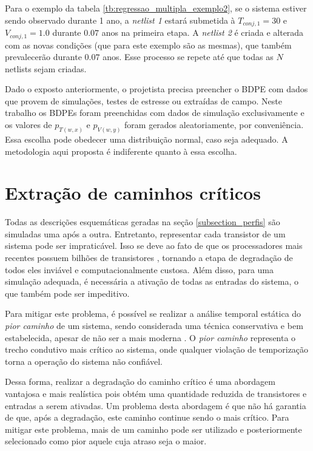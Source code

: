 Para o exemplo da tabela \ref{tb:regressao_multipla_exemplo2}, se o sistema estiver sendo observado durante 1 ano, a \textit{netlist 1} estará submetida à $T_{conj,1}=30$ e $V_{conj,1}=1.0$ durante $0.07$ anos na primeira etapa. A \textit{netlist 2} é criada e alterada com as novas condições (que para este exemplo são as mesmas), que também prevalecerão durante $0.07$ anos. Esse processo se repete até que todas as $N$ netlists sejam criadas.

Dado o exposto anteriormente, o projetista precisa preencher o BDPE com dados que provem de simulações, testes de estresse ou extraídas de campo. Neste trabalho os BDPEs foram preenchidas com dados de simulação exclusivamente e os valores de $p_{T(w,x)}$ e $p_{V(w,y)}$ foram gerados aleatoriamente, por conveniência. Essa escolha pode obedecer uma distribuição normal, caso seja adequado. A metodologia aqui proposta é indiferente quanto à essa escolha.

\section{Extração de caminhos críticos}
\label{section_extracao_caminhos}
Todas as descrições esquemáticas geradas na seção \ref{subsection_perfis} são simuladas uma após a outra. Entretanto, representar cada transistor de um sistema pode ser impraticável. Isso se deve ao fato de que os processadores mais recentes possuem bilhões de transistores \cite{Alcorn2016}, tornando a etapa de degradação de todos eles inviável e computacionalmente custosa. Além disso, para uma simulação adequada, é necessária a ativação de todas as entradas do sistema, o que também pode ser impeditivo.

Para mitigar este problema, é possível se realizar a análise temporal estática do \textit{pior caminho} de um sistema, sendo considerada uma técnica conservativa e bem estabelecida, apesar de não ser a mais moderna \cite{Orshansky2002}. O \textit{pior caminho} representa o trecho condutivo mais crítico ao sistema, onde qualquer violação de temporização torna a operação do sistema não confiável.

Dessa forma, realizar a degradação do caminho crítico é uma abordagem vantajosa e mais realística pois obtém uma quantidade reduzida de transistores e entradas a serem ativadas. Um problema desta abordagem é que não há garantia de que, após a degradação, este caminho continue sendo o mais crítico. Para mitigar este problema, mais de um caminho pode ser utilizado e posteriormente selecionado como pior aquele cuja atraso seja o maior.

